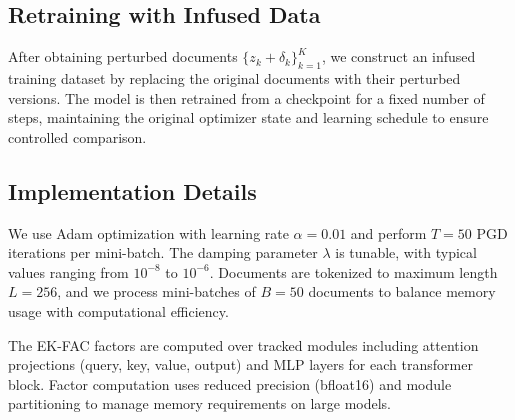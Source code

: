 \documentclass{article}
\theoremstyle{plain}
\theoremstyle{definition}
\theoremstyle{remark}
\begin{document}



\subsection{Retraining with Infused Data}

After obtaining perturbed documents $\{z_k + \delta_k\}_{k=1}^K$, we construct an infused training dataset by replacing the original documents with their perturbed versions. The model is then retrained from a checkpoint for a fixed number of steps, maintaining the original optimizer state and learning schedule to ensure controlled comparison.

\subsection{Implementation Details}

We use Adam optimization with learning rate $\alpha = 0.01$ and perform $T = 50$ PGD iterations per mini-batch. The damping parameter $\lambda$ is tunable, with typical values ranging from $10^{-8}$ to $10^{-6}$. Documents are tokenized to maximum length $L = 256$, and we process mini-batches of $B = 50$ documents to balance memory usage with computational efficiency.

The EK-FAC factors are computed over tracked modules including attention projections (query, key, value, output) and MLP layers for each transformer block. Factor computation uses reduced precision (bfloat16) and module partitioning to manage memory requirements on large models.
\end{document}

